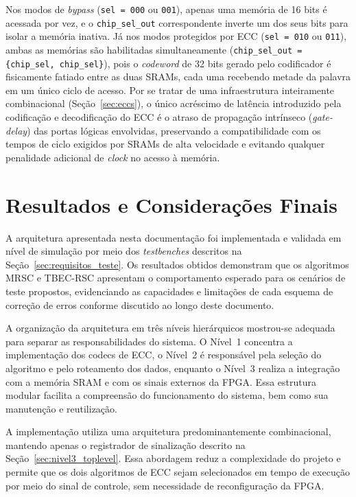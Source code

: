 \documentclass[12pt,a4paper]{article}
\begin{document}
Nos modos de \textit{bypass} (\texttt{sel = 000} ou \texttt{001}), apenas 
uma memória de 16 bits é acessada por vez, e o \texttt{chip\_sel\_out} 
correspondente inverte um dos seus bits para isolar a memória inativa. Já 
nos modos protegidos por ECC (\texttt{sel = 010} ou \texttt{011}), ambas as 
memórias são habilitadas simultaneamente (\texttt{chip\_sel\_out = 
\{chip\_sel, chip\_sel\}}), pois o \textit{codeword} de 32 bits gerado pelo 
codificador é fisicamente fatiado entre as duas SRAMs, cada uma recebendo 
metade da palavra em um único ciclo de acesso. Por se tratar de uma 
infraestrutura inteiramente combinacional (Seção~\ref{sec:eccs}), o único 
acréscimo de latência introduzido pela codificação e decodificação do ECC é 
o atraso de propagação intrínseco (\textit{gate-delay}) das portas lógicas 
envolvidas, preservando a compatibilidade com os tempos de ciclo exigidos 
por SRAMs de alta velocidade e evitando qualquer penalidade adicional de 
\textit{clock} no acesso à memória.

\section{Resultados e Considerações Finais}
\label{sec:conclusao}

A arquitetura apresentada nesta documentação foi implementada e validada em
nível de simulação por meio dos \textit{testbenches} descritos na
Seção~\ref{sec:requisitos_teste}. Os resultados obtidos demonstram que os
algoritmos MRSC e TBEC-RSC apresentam o comportamento esperado para os
cenários de teste propostos, evidenciando as capacidades e limitações de
cada esquema de correção de erros conforme discutido ao longo deste
documento.

A organização da arquitetura em três níveis hierárquicos mostrou-se
adequada para separar as responsabilidades do sistema. O Nível~1 concentra
a implementação dos codecs de ECC, o Nível~2 é responsável pela seleção do
algoritmo e pelo roteamento dos dados, enquanto o Nível~3 realiza a
integração com a memória SRAM e com os sinais externos da FPGA. Essa
estrutura modular facilita a compreensão do funcionamento do sistema, bem
como sua manutenção e reutilização.

A implementação utiliza uma arquitetura predominantemente combinacional,
mantendo apenas o registrador de sinalização descrito na
Seção~\ref{sec:nivel3_toplevel}. Essa abordagem reduz a complexidade do
projeto e permite que os dois algoritmos de ECC sejam selecionados em tempo
de execução por meio do sinal de controle, sem necessidade de
reconfiguração da FPGA.
\end{document}

